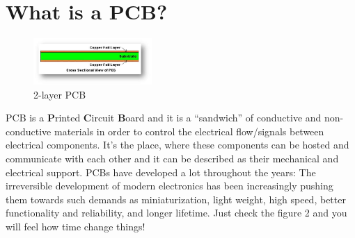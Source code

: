 \documentclass[final]{cubedoc}
\begin{document}
	\section{What is a PCB?}
	
	\begin{figure}
		\centering
		\includegraphics[width=0.4\textwidth]{assets/simple_2_layer_PCB.jpg}
		\caption{2-layer PCB}
		\label{fig:1}
	\end{figure}
	
	PCB is a \textbf{P}rinted \textbf{C}ircuit \textbf{B}oard and it is  a “sandwich” of conductive and non-conductive materials in order to control the electrical flow/signals between electrical components. It’s the place, where these components can be hosted and communicate with each other and it can be described as their mechanical and electrical support. PCBs have developed a lot throughout the years: The irreversible development of modern electronics has been increasingly pushing them towards such demands as miniaturization, light weight, high speed, better functionality and reliability, and longer lifetime. Just check the figure 2 and you will feel how time change things!
	
\end{document}
